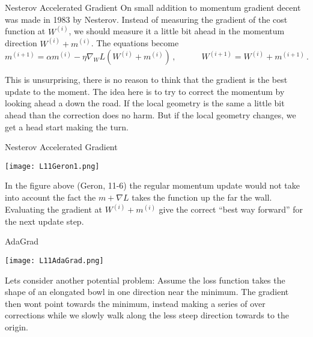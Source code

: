 \documentclass[10pt, table, dvipsnames,xcdraw,handout]{beamer}
\begin{document}
\begin{frame}[fragile]{Nesterov Accelerated Gradient}
On small addition to momentum gradient decent was made in 1983 by Nesterov. Instead of measuring the gradient of the cost function at $W^{(i)}$, we should measure it a little bit ahead in the momentum direction $W^{(i)} + m^{(i)}$. The equations become
$$
m^{(i+1)}= \alpha m^{(i)} -\eta \nabla_{W} L(W^{(i)} + m^{(i)})\,,\hspace{3em} W^{(i+1)} = W^{(i)}+m^{(i+1)}\,.
$$

This is unsurprising, there is no reason to think that the gradient is the best update to the moment. The idea here is to try to correct the momentum by looking ahead a down the road. If the local geometry is the same a little bit ahead than the correction does no harm. But if the local geometry changes, we get a head start making the turn. 
\end{frame}




\begin{frame}[fragile]{Nesterov Accelerated Gradient}
  \begin{minipage}[t][0.5\textheight][t]{\textwidth}
	\centering \texttt{[image: L11Geron1.png]} 
  \end{minipage}
  \vfill
\begin{minipage}[t][0.5\textheight][t]{\textwidth}
In the figure above (Geron, 11-6) the regular momentum update would not take into account the fact the $m + \nabla L$ takes the function up the far the wall. Evaluating the gradient at $W^{(i)}+m^{(i)}$ give the correct ``best way forward'' for the next update step. 
\end{minipage}
\end{frame}





\begin{frame}[fragile]{AdaGrad}
  \begin{minipage}[t][0.5\textheight][t]{\textwidth}
	\centering \texttt{[image: L11AdaGrad.png]} 
  \end{minipage}
  \vfill
\begin{minipage}[t][0.5\textheight][t]{\textwidth}
Lets consider another potential problem: Assume the loss function takes the shape of an elongated bowl in one direction near the minimum. The gradient then wont point towards the minimum, instead making a series of over corrections while we slowly walk along the less steep direction towards to the origin. 
\end{minipage}

\end{frame}
\end{document}
